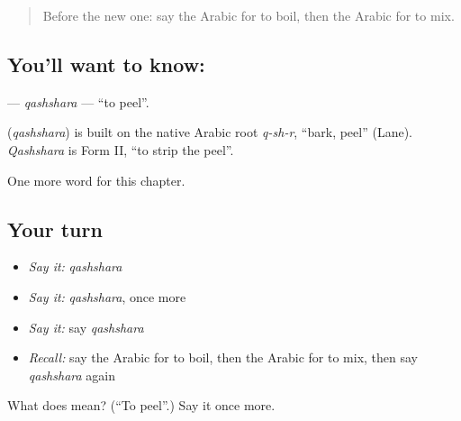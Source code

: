 \label{lesson:AR-C254-qashshara}



\begin{quote}
Before the new one: say the Arabic for to boil, then the Arabic for to mix.
\end{quote}

\subsection*{You'll want to know: }
\textbf{} — \emph{qashshara} — \textquotedblleft{}to peel\textquotedblright{}.

\begin{cousinweb}
\textbf{} (\emph{qashshara}) is built on the native Arabic root \emph{q-sh-r}, \textquotedblleft{}bark, peel\textquotedblright{} (Lane). \emph{Qashshara} is Form II, \textquotedblleft{}to strip the peel\textquotedblright{}.
\end{cousinweb}

\begin{grammarlens}[title={What you've built}]
One more word for this chapter.
\end{grammarlens}

\subsection*{Your turn}
\begin{itemize}
\raggedright
  \item \emph{Say it:} \emph{qashshara}
  \item \emph{Say it:} \emph{qashshara}, once more
  \item \emph{Say it:} say \emph{qashshara}
  \item \emph{Recall:} say the Arabic for to boil, then the Arabic for to mix, then say \emph{qashshara} again
\end{itemize}

\begin{tcolorbox}[breakable,colback=teal!4,colframe=teal!35!black,title={Before you move on}]
What does  mean? (\textquotedblleft{}To peel\textquotedblright{}.) Say it once more.
\end{tcolorbox}
